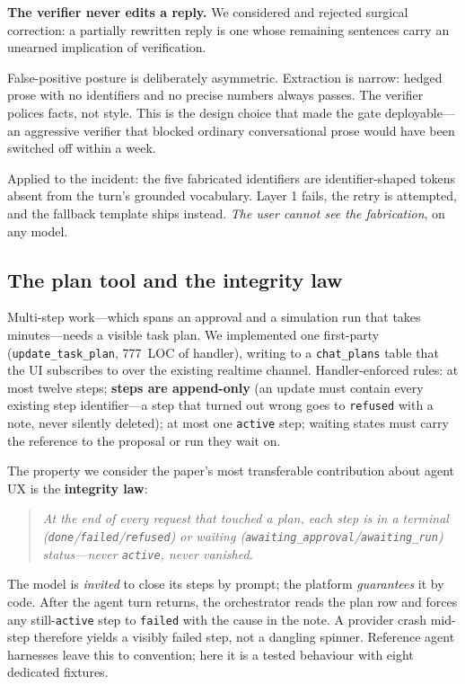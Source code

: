 \documentclass[conference]{IEEEtran}
\begin{document}
\textbf{The verifier never edits a reply.} We considered and rejected surgical
correction: a partially rewritten reply is one whose remaining sentences carry an
unearned implication of verification.

False-positive posture is deliberately asymmetric. Extraction is narrow: hedged
prose with no identifiers and no precise numbers always passes. The verifier
polices facts, not style. This is the design choice that made the gate
deployable---an aggressive verifier that blocked ordinary conversational prose
would have been switched off within a week.

Applied to the incident: the five fabricated identifiers are identifier-shaped
tokens absent from the turn's grounded vocabulary. Layer 1 fails, the retry is
attempted, and the fallback template ships instead. \emph{The user cannot see the
fabrication}, on any model.

\subsection{The plan tool and the integrity law}
\label{sec:plan}

Multi-step work---which spans an approval and a simulation run that takes
minutes---needs a visible task plan. We implemented one first-party
(\texttt{update\_task\_plan}, 777~LOC of handler), writing to a
\texttt{chat\_plans} table that the UI subscribes to over the existing realtime
channel. Handler-enforced rules: at most twelve steps; \textbf{steps are
append-only} (an update must contain every existing step identifier---a step that
turned out wrong goes to \texttt{refused} with a note, never silently deleted);
at most one \texttt{active} step; waiting states must carry the reference to the
proposal or run they wait on.

The property we consider the paper's most transferable contribution about agent
UX is the \textbf{integrity law}:

\begin{quote}
\itshape
At the end of every request that touched a plan, each step is in a terminal
(\texttt{done}/\texttt{failed}/\texttt{refused}) or waiting
(\texttt{awaiting\_approval}/\texttt{awaiting\_run}) status---never
\texttt{active}, never vanished.
\end{quote}

The model is \emph{invited} to close its steps by prompt; the platform
\emph{guarantees} it by code. After the agent turn returns, the orchestrator reads
the plan row and forces any still-\texttt{active} step to \texttt{failed} with the
cause in the note. A provider crash mid-step therefore yields a visibly failed
step, not a dangling spinner. Reference agent harnesses leave this to convention;
here it is a tested behaviour with eight dedicated fixtures.
\end{document}
